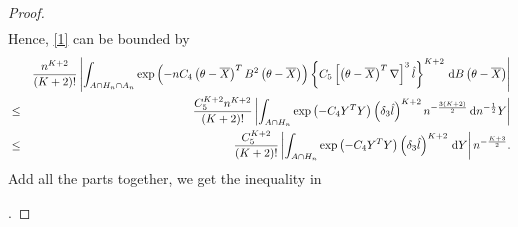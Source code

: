 \begin{proof}
\begin{eqnarray*}
\end{eqnarray*}
Hence, \eqref{1} can be bounded by 
\begin{eqnarray*}
 &  & \frac{n^{K+2}}{\left(K+2\right)!}\left|\int_{A\cap H_{n}\cap A_{n}}\exp\left(-nC_{4}\left(\theta-\overline{X}\right)^{T}B^{2}\left(\theta-\overline{X}\right)\right)\left\{ C_{5}\left[\left(\theta-\overline{X}\right)^{T}\nabla\right]^{3}\hat{l}\right\} ^{K+2}\,\mathrm{d} B\left(\theta-\overline{X}\right)\right|\\
 & \le & \frac{C_{5}^{K+2}n^{K+2}}{\left(K+2\right)!}\left|\int_{A\cap H_{n}}\exp\left(-C_{4}Y^{T}Y\right)\left(\delta_{3}\hat{l}\right)^{K+2}n^{-\frac{3\left(K+2\right)}{2}}\,\mathrm{d} n^{-\frac{1}{2}}Y\right|\\
 & \le & \frac{C_{5}^{K+2}}{\left(K+2\right)!}\left|\int_{A\cap H_{n}}\exp\left(-C_{4}Y^{T}Y\right)\left(\delta_{3}\hat{l}\right)^{K+2}\,\mathrm{d} Y\right|n^{-\frac{K+3}{2}}.
\end{eqnarray*}
Add all the parts together, we get the inequality in %
\begin{comment}
add ref to main theorem
\end{comment}
.
\end{proof}
